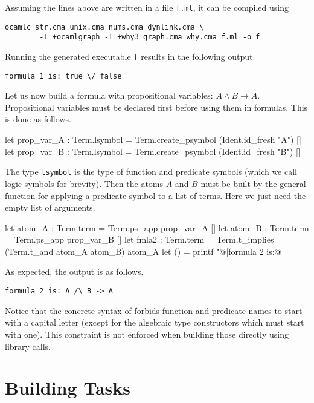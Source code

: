 Assuming the lines above are written in a file \texttt{f.ml}, it can
be compiled using
\begin{verbatim}
ocamlc str.cma unix.cma nums.cma dynlink.cma \
        -I +ocamlgraph -I +why3 graph.cma why.cma f.ml -o f
\end{verbatim}
Running the generated executable \texttt{f} results in the following output.
\begin{verbatim}
formula 1 is: true \/ false
\end{verbatim}

Let us now build a formula with propositional variables: $A \land B
\rightarrow A$. Propositional variables must be declared first before
using them in formulas. This is done as follows.
\begin{ocamlcode}
let prop_var_A : Term.lsymbol =
  Term.create_psymbol (Ident.id_fresh "A") []
let prop_var_B : Term.lsymbol =
  Term.create_psymbol (Ident.id_fresh "B") []
\end{ocamlcode}
The type \texttt{lsymbol} is the type of function and predicate symbols (which
we call logic symbols for brevity). Then the atoms $A$ and $B$ must be built
by the general function for applying a predicate symbol to a list of terms.
Here we just need the empty list of arguments.
\begin{ocamlcode}
let atom_A : Term.term = Term.ps_app prop_var_A []
let atom_B : Term.term = Term.ps_app prop_var_B []
let fmla2 : Term.term =
  Term.t_implies (Term.t_and atom_A atom_B) atom_A
let () = printf "@[formula 2 is:@ %
\end{ocamlcode}

As expected, the output is as follows.
\begin{verbatim}
formula 2 is: A /\ B -> A
\end{verbatim}
Notice that the concrete syntax of \why forbids function and predicate
names to start with a capital letter (except for the algebraic type
constructors which must start with one). This constraint is not enforced
when building those directly using library calls.

\section{Building Tasks}

